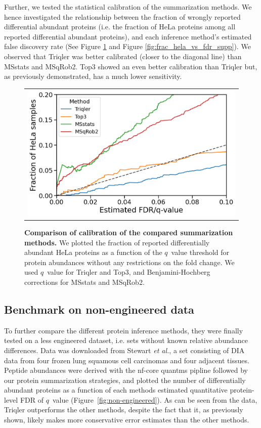 \documentclass[10pt,letterpaper]{article}
\begin{document}
Further, we tested the statistical calibration of the summarization methods. We hence investigated the relationship between the fraction of wrongly reported differential abundant proteins (i.e. the fraction of HeLa proteins among all reported differential abundant proteins), and each inference method's estimated false discovery rate (See Figure \ref{fig:frac_hela_vs_fdr} and Figure \ref{fig:frac_hela_vs_fdr_supp}). We observed that Triqler was better calibrated (closer to the diagonal line) than MSstats and MSqRob2. Top3 showed an even better calibration than Triqler but, as previously demonstrated, has a much lower sensitivity.

\begin{figure}[hbt]
    \centering
    \begin{tabular}{c} 
        \includegraphics[width=0.5\linewidth]{../../result/report_plots_pipeline/calibration_ID_0.png}
    \end{tabular}
  \caption{{\bf Comparison of calibration of the compared summarization methods.} We plotted the fraction of reported differentially abundant HeLa proteins as a function of the $q$~value threshold for protein abundances without any restrictions on the fold change. We used $q$~value for Triqler and Top3, and Benjamini-Hochberg corrections for MSstats and MSqRob2. \label{fig:frac_hela_vs_fdr}}
\end{figure}


\subsection*{Benchmark on non-engineered data}

To further compare the different protein inference methods, they were finally tested on a less engineered dataset, i.e. sets without known relative abundance differences.  Data was downloaded from Stewart {\em et al.}, a set consisting of DIA data from four frozen lung squamous cell carcinomas and four adjacent tissues. Peptide abundances were derived with the nf-core quantms pipline followed by our protein summarization strategies, and plotted the number of differentially abundant proteins as a function of each methods estimated quantitative protein-level FDR of $q$~value (Figure~\ref{fig:non-engineered}). As can be seen from the data, Triqler outperforms the other methods, despite the fact that it, as previously shown, likely makes more conservative error estimates than the other methods.
\end{document}
